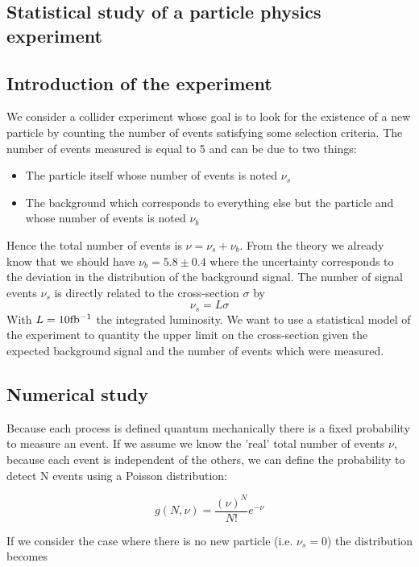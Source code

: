 \documentclass[10 pt]{article}
\numberwithin{equation}{section}
\begin{document}
\begin{multicols}{2}
\section{Statistical study of a particle physics experiment}
\subsection{Introduction of the experiment}
We consider a collider experiment whose goal is to look for the existence of a new particle by counting the number of events satisfying some selection criteria. The number of events measured is equal to 5 and can be due to two things\cite{sig}:

\begin{itemize}
\item The particle itself whose number of events is noted $\nu_s$
\item The background which corresponds to everything else but the particle and whose number of events is noted $\nu_b$
\end{itemize}

Hence the total number of events is $\nu = \nu_s + \nu_b$. From the theory we already know that we should have $\nu_b = 5.8 \pm 0.4$ where the uncertainty corresponds to the deviation in the distribution of the background signal.
The number of signal events $\nu_s$ is directly related to the cross-section $\sigma$ by
\begin{equation}
\nu_s = L \sigma
\end{equation}
With $L = 10 \rm fb^{-1}$ the integrated luminosity. We want to use a statistical model of the experiment to quantity the upper limit on the cross-section given the expected background signal and the number of events which were measured.

\subsection{Numerical study}
Because each process is defined quantum mechanically there is a fixed probability to measure an event. If we assume we know the 'real' total number of events $\nu$, because each event is independent of the others, we can define the probability to detect N events using a Poisson distribution:

\begin{equation}
g(N,\nu) = \frac{(\nu)^N}{N!} e^{-\nu}
\end{equation}

If we consider the case where there is no new particle (i.e. $\nu_s = 0$) the distribution becomes


\end{multicols}
\end{document}
